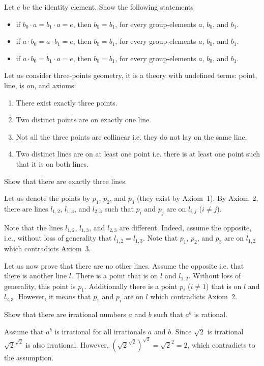 \begin{chapterendexercises}
        Let $e$ be the identity element. Show the following statements
        \begin{itemize}
          \item if $b_0 \cdot a = b_1 \cdot a = e$, then $b_0 = b_1$, for every
            group-elements $a$, $b_0$, and $b_1$.
          \item if $a \cdot b_0 = a \cdot b_1 = e$, then $b_0 = b_1$, for every
            group-elements $a$, $b_0$, and $b_1$.
          \item if $a \cdot b_0 = b_1 \cdot a = e$, then $b_0 = b_1$, for every
            group-elements $a$, $b_0$, and $b_1$.
        \end{itemize}
    \exercise Let us consider three-points geometry, it is a theory with
        undefined terms: point, line, is on, and axioms:
        \begin{enumerate}
            \item There exist exactly three points.
            \item Two distinct points are on exactly one line.
            \item Not all the three points are collinear i.e. they do not lay on the
                same line.
            \item Two distinct lines are on at least one point i.e. there is at
              least one point such that it is on both lines.
        \end{enumerate}

        Show that there are exactly three lines.

        \begin{solution}
            Let us denote the points by $p_1$, $p_2$, and $p_3$ (they exist by
            Axiom~1). By Axiom~2, there are lines $l_{1, 2}$,
            $l_{1, 3}$, and $l_{2, 3}$ such that $p_i$ and $p_j$ are on
            $l_{i, j}$ ($i \neq j$).

            Note that the lines $l_{1, 2}$, $l_{1, 3}$, and $l_{2, 3}$ are different.
            Indeed, assume the opposite, i.e., without loss of generality that
            $l_{1, 2} = l_{1, 3}$. Note that $p_1$, $p_2$, and $p_3$ are on $l_{1, 2}$
            which contradicts Axiom~3.

            Let us now prove that there are no other lines. Assume the
            opposite i.e. that there is another line $l$. There is a
            point that is on $l$ and $l_{1, 2}$. Without loss of generality,
            this point is $p_1$. Additionally there is a point $p_i$
            ($i \neq 1$) that is on $l$ and  $l_{2, 3}$. However, it means that
            $p_1$ and $p_i$ are on $l$ which contradicts Axiom~2.
        \end{solution}
    \exercise Show that there are irrational numbers $a$ and $b$ such that
        $a^b$ is rational.
        \begin{solution}
          Assume that $a^b$ is irrational for all irrationals $a$ and $b$. Since
          $\sqrt{2}$ is irrational $\sqrt{2}^{\sqrt{2}}$ is also irrational.
          However, $(\sqrt{2}^{\sqrt{2}})^{\sqrt{2}} = \sqrt{2}^2 = 2$, which
          contradicts to the assumption.


\end{solution}
\end{chapterendexercises}
